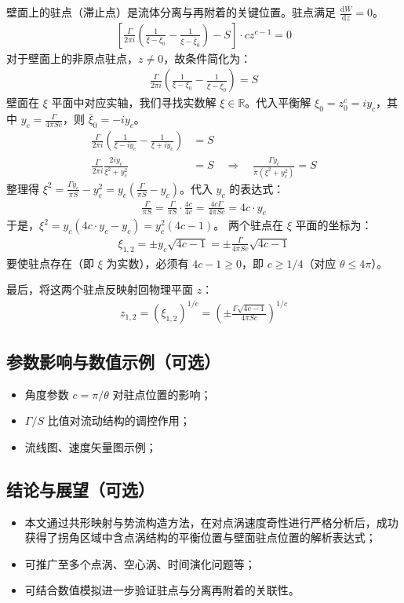 壁面上的驻点（滞止点）是流体分离与再附着的关键位置。驻点满足 $\frac{\mathrm{d}W}{\mathrm{d}z} = 0$。
\begin{align*}
    \left[ \frac{\Gamma}{2\pi i} \left( \frac{1}{\xi - \xi_0} - \frac{1}{\xi - \bar{\xi}_0} \right) - S \right] \cdot c z^{c-1} = 0
\end{align*}
对于壁面上的非原点驻点，$z\neq 0$，故条件简化为：
\begin{align}
    \frac{\Gamma}{2\pi i} \left( \frac{1}{\xi - \xi_0} - \frac{1}{\xi - \bar{\xi}_0} \right) = S
\end{align}
壁面在 $\xi$ 平面中对应实轴，我们寻找实数解 $\xi \in \mathbb{R}$。代入平衡解 $\xi_0 = z_0^c = i y_c$，其中 $y_c = \frac{\Gamma}{4\pi S c}$，则 $\bar{\xi}_0 = -iy_c$。
\begin{align*}
    \frac{\Gamma}{2\pi i} \left( \frac{1}{\xi - iy_c} - \frac{1}{\xi + iy_c} \right) &= S \\
    \frac{\Gamma}{2\pi i} \frac{2iy_c}{\xi^2 + y_c^2} &= S \quad \Rightarrow \quad \frac{\Gamma y_c}{\pi(\xi^2 + y_c^2)} = S
\end{align*}
整理得 $\xi^2 = \frac{\Gamma y_c}{\pi S} - y_c^2 = y_c \left(\frac{\Gamma}{\pi S} - y_c\right)$。代入 $y_c$ 的表达式：
\begin{align*}
    \frac{\Gamma}{\pi S} = \frac{\Gamma}{\pi S} \cdot \frac{4c}{4c} = \frac{4c \Gamma}{4\pi S c} = 4c \cdot y_c
\end{align*}
于是，$\xi^2 = y_c (4c \cdot y_c - y_c) = y_c^2(4c-1)$。
两个驻点在 $\xi$ 平面的坐标为：
\begin{align}
    \xi_{1,2} = \pm y_c \sqrt{4c-1} = \pm \frac{\Gamma}{4\pi S c}\sqrt{4c-1}
\end{align}
要使驻点存在（即 $\xi$ 为实数），必须有 $4c-1 \geq 0$，即 $c \geq 1/4$（对应 $\theta \leq 4\pi$）。

最后，将这两个驻点反映射回物理平面 $z$：
\begin{align}
    z_{1,2} = (\xi_{1,2})^{1/c} = \left( \pm \frac{\Gamma\sqrt{4c-1}}{4\pi S c} \right)^{1/c}
\end{align}

\subsection{参数影响与数值示例（可选）}
\begin{itemize}
    \item 角度参数 $c=\pi/\theta$ 对驻点位置的影响；
    \item $\Gamma/S$ 比值对流动结构的调控作用；
    \item 流线图、速度矢量图示例；
\end{itemize}

\subsection{结论与展望（可选）}
\begin{itemize}
    \item 本文通过共形映射与势流构造方法，在对点涡速度奇性进行严格分析后，成功获得了拐角区域中含点涡结构的平衡位置与壁面驻点位置的解析表达式；
    \item 可推广至多个点涡、空心涡、时间演化问题等；
    \item 可结合数值模拟进一步验证驻点与分离再附着的关联性。
\end{itemize}


